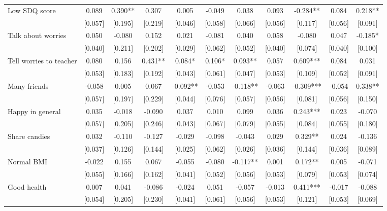 \documentclass[12pt]{article}
\begin{document}
\begin{table}[ht]
\begin{center}
\begin{adjustbox}{width=1.2\textwidth,center=\textwidth}
\begin{tabular}{l*{10}{c}}
Low SDQ score  & 0.089 & 0.390** & 0.307 & 0.005 & -0.049 & 0.038 & 0.093 & -0.284** & 0.084 & 0.218** \\
 & [0.057] & [0.195] & [0.219] & [0.046] & [0.058] & [0.066] & [0.056] & [0.117] & [0.056] & [0.091] \\
Talk about worries  & 0.050 & -0.080 & 0.152 & 0.021 & -0.081 & 0.040 & 0.058 & -0.080 & 0.047 & -0.185* \\
 & [0.040] & [0.211] & [0.202] & [0.029] & [0.062] & [0.052] & [0.040] & [0.074] & [0.040] & [0.100] \\
Tell worries to teacher & 0.080 & 0.156 & 0.431** & 0.084* & 0.106* & 0.093** & 0.057 & 0.609*** & 0.084 & 0.031 \\
 & [0.053] & [0.183] & [0.192] & [0.043] & [0.061] & [0.047] & [0.053] & [0.109] & [0.052] & [0.091] \\
Many friends  & -0.058 & 0.005 & 0.067 & -0.092** & -0.053 & -0.118** & -0.063 & -0.309*** & -0.054 & 0.338** \\
 & [0.057] & [0.197] & [0.229] & [0.044] & [0.076] & [0.057] & [0.056] & [0.081] & [0.056] & [0.150] \\
Happy in general & 0.035 & -0.018 & -0.090 & 0.037 & 0.010 & 0.099 & 0.036 & 0.243*** & 0.023 & -0.070 \\
 & [0.057] & [0.205] & [0.246] & [0.043] & [0.067] & [0.079] & [0.055] & [0.084] & [0.055] & [0.180] \\
Share candies & 0.032 & -0.110 & -0.127 & -0.029 & -0.098 & -0.043 & 0.029 & 0.329** & 0.024 & -0.136 \\
 & [0.037] & [0.126] & [0.144] & [0.025] & [0.062] & [0.026] & [0.036] & [0.144] & [0.036] & [0.089] \\
Normal BMI & -0.022 & 0.155 & 0.067 & -0.055 & -0.080 & -0.117** & 0.001 & 0.172** & 0.005 & -0.071 \\
 & [0.055] & [0.166] & [0.162] & [0.041] & [0.052] & [0.056] & [0.053] & [0.079] & [0.053] & [0.074] \\
Good health & 0.007 & 0.041 & -0.086 & -0.024 & 0.051 & -0.057 & -0.013 & 0.411*** & -0.017 & -0.088 \\
 & [0.054] & [0.205] & [0.230] & [0.041] & [0.061] & [0.056] & [0.053] & [0.121] & [0.053] & [0.069] \\

\end{tabular}
\end{adjustbox}
\end{center}
\end{table}
\end{document}
